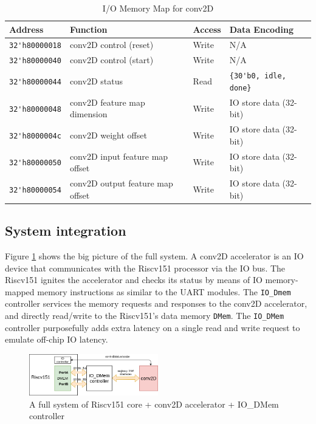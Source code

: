 \documentclass[11pt]{article}
\begin{document}
\begin{table}[hbt]
  \begin{center}
    \caption{I/O Memory Map for conv2D}
    \label{mem_map_conv2D}
    \begin{adjustbox}{width=\columnwidth,center}
    \begin{tabular}{l l l l}
      \toprule
      \textbf{Address} & \textbf{Function} & \textbf{Access} & \textbf{Data Encoding}\\
      \midrule
      \verb|32'h80000018| & conv2D control (reset) & Write & N/A \\
      \verb|32'h80000040| & conv2D control (start) & Write & N/A \\
      \verb|32'h80000044| & conv2D status & Read & \verb|{30'b0, idle, done}| \\
      \verb|32'h80000048| & conv2D feature map dimension & Write & IO store data (32-bit) \\
      \verb|32'h8000004c| & conv2D weight offset & Write & IO store data (32-bit) \\
      \verb|32'h80000050| & conv2D input feature map offset & Write & IO store data (32-bit) \\
      \verb|32'h80000054| & conv2D output feature map offset & Write & IO store data (32-bit) \\
      \bottomrule
    \end{tabular}
    \end{adjustbox}
  \end{center}
\end{table}

\subsection{System integration}

Figure \ref{fig:system_integration} shows the big picture of the full system. A conv2D accelerator is an IO device that communicates with the Riscv151 processor via the IO bus. The Riscv151 ignites the accelerator and checks its status by means of IO memory-mapped memory instructions as similar to the UART modules. The \texttt{IO\_Dmem} controller services the memory requests and responses to the conv2D accelerator, and directly read/write to the Riscv151's data memory \texttt{DMem}. The \texttt{IO\_DMem} controller purposefully adds extra latency on a single read and write request to emulate off-chip IO latency.

\begin{figure}[hbt]
\begin{center}
  \includegraphics[width=0.5\textwidth]{Riscv151_conv2D.png}
  \caption{A full system of Riscv151 core + conv2D accelerator + IO\_DMem controller}
  \label{fig:system_integration}
\end{center}
\end{figure}
\end{document}
